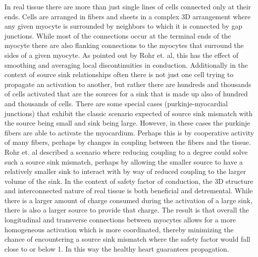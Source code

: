 \documentclass[12pt]{article}
\begin{document}
In real tissue there are more than just single lines of cells connected only at their ends. Cells are arranged in fibers and sheets in a complex 3D arrangement where any given myocyte is surrounded by neighbors to which it is connected by gap junctions. While most of the connections occur at the terminal ends of the myocyte there are also flanking connections to the myocytes that surround the sides of a given myocyte. As pointed out by Rohr et. al, this has the effect of smoothing and averaging local discontinuities in conduction.\cite{Rohr2004} Additionally in the context of source sink relationships often there is not just one cell trying to propagate an activation to another, but rather there are hundreds and thousands of cells activated that are the sources for a sink that is made up also of hundred and thousands of cells. There are some special cases (purkinje-myocardial junctions) that exhibit the classic scenario expected of source sink mismatch with the source being small and sink being large. However, in these cases the purkinje fibers are able to activate the myocardium. Perhaps this is by cooperative activity of many fibers, perhaps by changes in coupling between the fibers and the tissue. Rohr et. al described a scenario where reducing coupling to a degree could solve such a source sink mismatch, perhaps by allowing the smaller source to have a relatively smaller sink to interact with by way of reduced coupling to the larger volume of the sink.\cite{Rohr2004} In the context of safety factor of conduction, the 3D structure and interconnected nature of real tissue is both beneficial and detremental. While there is a larger amount of charge consumed during the activation of a large sink, there is also a larger source to provide that charge. The result is that overall the longitudinal and transverse connections between myocytes allows for a more homogeneous activation which is more coordinated, thereby minimizing the chance of encountering a source sink mismatch where the safety factor would fall close to or below 1. In this way the healthy heart guarantees propagation.



\end{document}
